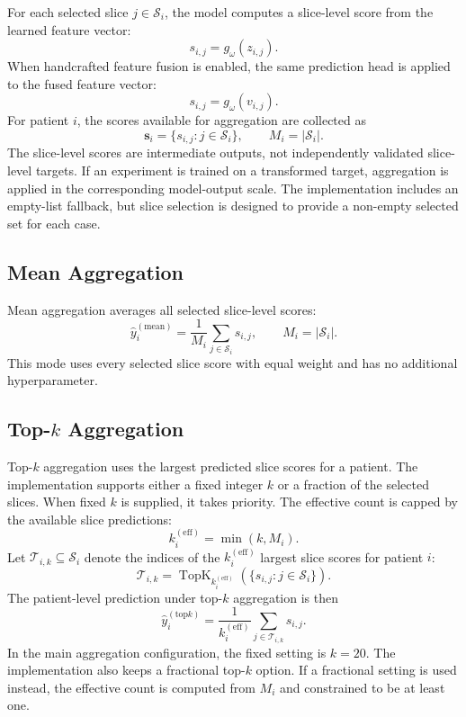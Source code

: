 For each selected slice \(j \in \mathcal{S}_i\), the model computes a slice-level score from the learned feature vector:
\[
s_{i,j}
=
g_{\omega}(z_{i,j}).
\]
When handcrafted feature fusion is enabled, the same prediction head is applied to the fused feature vector:
\[
s_{i,j}
=
g_{\omega}(v_{i,j}).
\]
For patient \(i\), the scores available for aggregation are collected as
\[
\mathbf{s}_i
=
\{s_{i,j}: j \in \mathcal{S}_i\},
\qquad
M_i = |\mathcal{S}_i|.
\]
The slice-level scores are intermediate outputs, not independently validated slice-level targets. If an experiment is trained on a transformed target, aggregation is applied in the corresponding model-output scale. The implementation includes an empty-list fallback, but slice selection is designed to provide a non-empty selected set for each case.


\subsection{Mean Aggregation}
\label{sec:mean_aggregation}

Mean aggregation averages all selected slice-level scores:
\[
\hat{y}_i^{(\mathrm{mean})}
=
\frac{1}{M_i}
\sum_{j \in \mathcal{S}_i}
s_{i,j},
\qquad
M_i = |\mathcal{S}_i|.
\]
This mode uses every selected slice score with equal weight and has no additional hyperparameter.


\subsection[Top-k Aggregation]{Top-\(k\) Aggregation}
\label{sec:topk_aggregation}

Top-\(k\) aggregation uses the largest predicted slice scores for a patient. The implementation supports either a fixed integer \(k\) or a fraction of the selected slices. When fixed \(k\) is supplied, it takes priority. The effective count is capped by the available slice predictions:
\[
k_i^{(\mathrm{eff})}
=
\min(k, M_i).
\]
Let \(\mathcal{T}_{i,k} \subseteq \mathcal{S}_i\) denote the indices of the \(k_i^{(\mathrm{eff})}\) largest slice scores for patient \(i\):
\[
\mathcal{T}_{i,k}
=
\operatorname{TopK}_{k_i^{(\mathrm{eff})}}
\left(\{s_{i,j}: j \in \mathcal{S}_i\}\right).
\]
The patient-level prediction under top-\(k\) aggregation is then
\[
\hat{y}_i^{(\mathrm{top}k)}
=
\frac{1}{k_i^{(\mathrm{eff})}}
\sum_{j \in \mathcal{T}_{i,k}}
s_{i,j}.
\]
In the main aggregation configuration, the fixed setting is \(k=20\). The implementation also keeps a fractional top-\(k\) option. If a fractional setting is used instead, the effective count is computed from \(M_i\) and constrained to be at least one.


